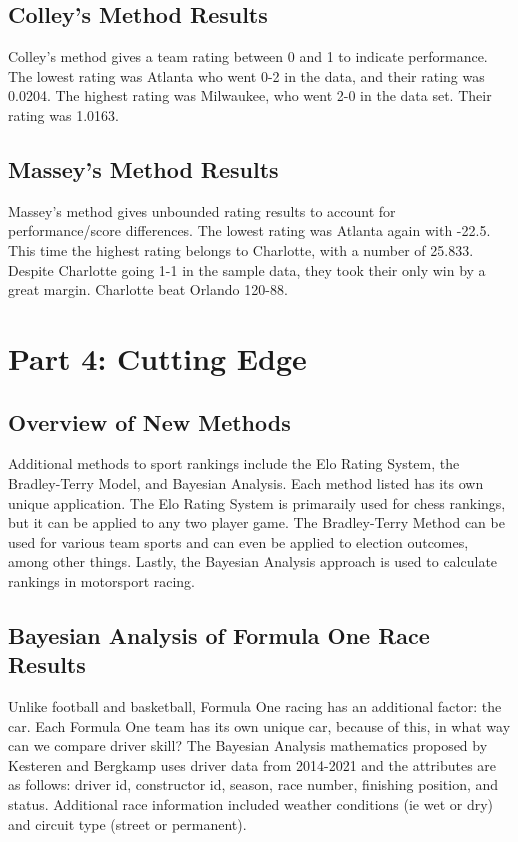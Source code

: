 \documentclass[12pt]{article}
\begin{document}
\subsection{Colley's Method Results}
Colley's method gives a team rating between 0 and 1 to indicate performance. 
The lowest rating was Atlanta who went 0-2 in the data, and their rating 
was 0.0204. The highest rating was Milwaukee, who went 2-0 in the data set. 
Their rating was 1.0163.

\subsection{Massey's Method Results}
Massey's method gives unbounded rating results to account for performance/score 
differences. The lowest rating was Atlanta again with -22.5. This time the 
highest rating belongs to Charlotte, with a number of 25.833. Despite Charlotte going 1-1 
in the sample data, they took their only win by a great margin. Charlotte beat 
Orlando 120-88.

\section{Part 4: Cutting Edge}
\subsection{Overview of New Methods}
Additional methods to sport rankings include the Elo Rating System, the Bradley-Terry Model,
and Bayesian Analysis. Each method listed has its own unique application. The Elo Rating System 
is primaraily used for chess rankings, but it can be applied to any two player game. 
The Bradley-Terry Method can be used for various team sports and can even be applied to 
election outcomes, among other things. Lastly, the Bayesian Analysis approach is used 
to calculate rankings in motorsport racing.

\subsection{Bayesian Analysis of Formula One Race Results}
Unlike football and basketball, Formula One racing has an additional factor: the car.
Each Formula One team has its own unique car, because of this, in what way can we compare
driver skill? The Bayesian Analysis mathematics proposed by Kesteren and Bergkamp uses driver data 
from 2014-2021 and the attributes are as follows: driver id, constructor id, season, race number, 
finishing position, and status. Additional race information included weather conditions (ie wet 
or dry) and circuit type (street or permanent).
\end{document}
